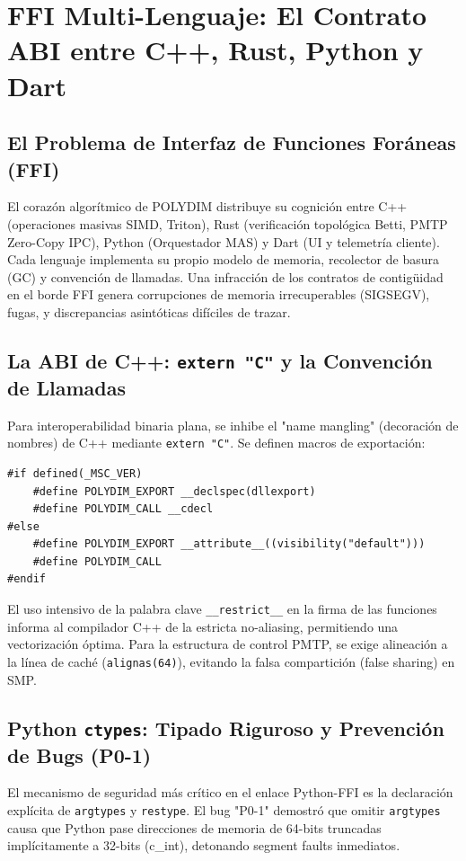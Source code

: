 \chapter{FFI Multi-Lenguaje: El Contrato ABI entre C++, Rust, Python y Dart}

\section{El Problema de Interfaz de Funciones Foráneas (FFI)}
El corazón algorítmico de POLYDIM distribuye su cognición entre C++ (operaciones masivas SIMD, Triton), Rust (verificación topológica Betti, PMTP Zero-Copy IPC), Python (Orquestador MAS) y Dart (UI y telemetría cliente). Cada lenguaje implementa su propio modelo de memoria, recolector de basura (GC) y convención de llamadas. Una infracción de los contratos de contigüidad en el borde FFI genera corrupciones de memoria irrecuperables (SIGSEGV), fugas, y discrepancias asintóticas difíciles de trazar.

\section{La ABI de C++: \texttt{extern "C"} y la Convención de Llamadas}
Para interoperabilidad binaria plana, se inhibe el "name mangling" (decoración de nombres) de C++ mediante \texttt{extern "C"}.
Se definen macros de exportación:
\begin{verbatim}
#if defined(_MSC_VER)
    #define POLYDIM_EXPORT __declspec(dllexport)
    #define POLYDIM_CALL __cdecl
#else
    #define POLYDIM_EXPORT __attribute__((visibility("default")))
    #define POLYDIM_CALL
#endif
\end{verbatim}
El uso intensivo de la palabra clave \texttt{\_\_restrict\_\_} en la firma de las funciones informa al compilador C++ de la estricta no-aliasing, permitiendo una vectorización óptima. Para la estructura de control PMTP, se exige alineación a la línea de caché (\texttt{alignas(64)}), evitando la falsa compartición (false sharing) en SMP.

\section{Python \texttt{ctypes}: Tipado Riguroso y Prevención de Bugs (P0-1)}
El mecanismo de seguridad más crítico en el enlace Python-FFI es la declaración explícita de \texttt{argtypes} y \texttt{restype}. El bug "P0-1" demostró que omitir \texttt{argtypes} causa que Python pase direcciones de memoria de 64-bits truncadas implícitamente a 32-bits (c\_int), detonando segment faults inmediatos.

